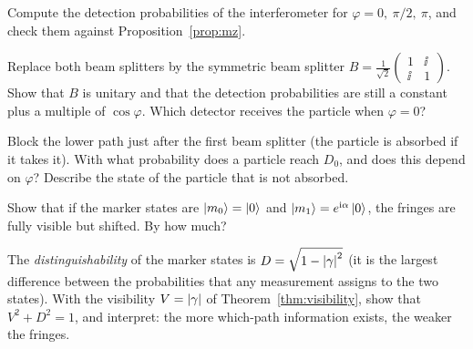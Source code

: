 \begin{exerciseset}
   Compute the detection probabilities of the interferometer for $\varphi=0,\ \pi/2,\ \pi$, and check them against Proposition~\ref{prop:mz}.

   Replace both beam splitters by the symmetric beam splitter $B=\tfrac1{\sqrt2}\begin{pmatrix}1&\ii\\\ii&1\end{pmatrix}$. Show that $B$ is unitary and that the detection probabilities are still a constant plus a multiple of $\cos\varphi$. Which detector receives the particle when $\varphi=0$?

   Block the lower path just after the first beam splitter (the particle is absorbed if it takes it). With what probability does a particle reach $D_0$, and does this depend on $\varphi$? Describe the state of the particle that is not absorbed.

   Show that if the marker states are $\left|m_0\right\rangle=\left|0\right\rangle$ and $\left|m_1\right\rangle=e^{\mathrm{i}\alpha}\left|0\right\rangle$, the fringes are fully visible but shifted. By how much?

   The \emph{distinguishability} of the marker states is $D=\sqrt{1-\left|\gamma\right|^2}$ (it is the largest difference between the probabilities that any measurement assigns to the two states). With the visibility $V=\left|\gamma\right|$ of Theorem~\ref{thm:visibility}, show that $V^2+D^2=1$, and interpret: the more which-path information exists, the weaker the fringes.
\end{exerciseset}
